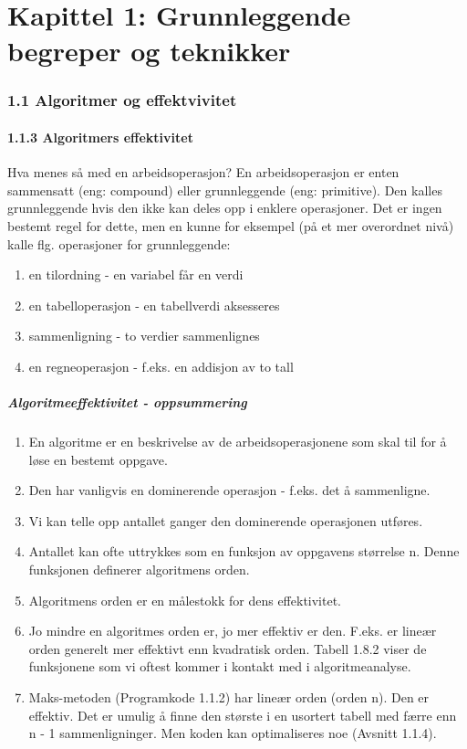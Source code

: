 \documentclass[11pt]{article}
\begin{document}
\tableofcontents
\newpage

\part{Kapittel 1: Grunnleggende begreper og teknikker}

\section{1.1 Algoritmer og effektvivitet}
    \subsection{1.1.3 Algoritmers effektivitet}
        Hva menes så med en arbeidsoperasjon? En arbeidsoperasjon er enten sammensatt (eng:
        compound) eller grunnleggende (eng: primitive). Den kalles grunnleggende hvis den ikke kan
        deles opp i enklere operasjoner. Det er ingen bestemt regel for dette, men en kunne for
        eksempel (på et mer overordnet nivå) kalle flg. operasjoner for grunnleggende: 
        \begin{enumerate}
            \item en tilordning - en variabel får en verdi
            \item en tabelloperasjon - en tabellverdi aksesseres
            \item sammenligning - to verdier sammenlignes
            \item en regneoperasjon - f.eks. en addisjon av to tall
        \end{enumerate}

        \subsubsection{Algoritmeeffektivitet - oppsummering}
            \begin{enumerate}
                \item En algoritme er en beskrivelse av de arbeidsoperasjonene som skal til for å løse en bestemt oppgave.
                \item Den har vanligvis en dominerende operasjon - f.eks. det å sammenligne.
                \item Vi kan telle opp antallet ganger den dominerende operasjonen utføres.
                \item Antallet kan ofte uttrykkes som en funksjon av oppgavens størrelse n. Denne funksjonen definerer algoritmens orden.
                \item Algoritmens orden er en målestokk for dens effektivitet.
                \item Jo mindre en algoritmes orden er, jo mer effektiv er den. F.eks. er lineær orden generelt mer effektivt enn kvadratisk orden. Tabell 1.8.2 viser de funksjonene som vi oftest kommer i kontakt med i algoritmeanalyse.
                \item Maks-metoden (Programkode 1.1.2) har lineær orden (orden n). Den er effektiv. Det er umulig å finne den største i en usortert tabell med færre enn n - 1 sammenligninger. Men koden kan optimaliseres noe (Avsnitt 1.1.4).
            \end{enumerate}
\end{document}
